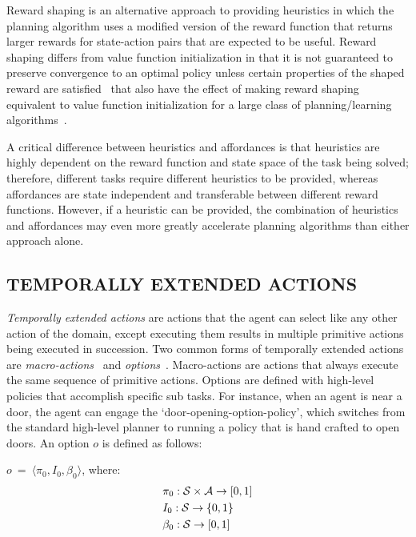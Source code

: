 \documentclass[]{article}
\newcommand{\jmnote}[1]{\textcolor{Green}{\textbf{JM: #1}}}
\begin{document}
Reward shaping is an alternative approach to providing heuristics in which the planning algorithm uses a modified version of the reward function that returns larger rewards for state-action pairs that are expected to be useful. Reward shaping differs from value function initialization in that it is not guaranteed to preserve convergence to an optimal policy unless certain properties of the shaped reward are satisfied~\cite{potshap} that also have the effect of making reward shaping equivalent to value function initialization for a large class of planning/learning algorithms~\cite{Wiewiora:2003fk}.

A critical difference between heuristics and affordances is that heuristics are highly dependent on the reward function and state space of the task being solved; therefore, different tasks require different heuristics to be provided, whereas affordances are state independent and transferable between different reward functions. However, if a heuristic can be provided, the combination of heuristics and affordances may even more greatly accelerate planning algorithms than either approach alone.


\subsection{TEMPORALLY EXTENDED ACTIONS}

{\em Temporally extended actions} are actions that the agent can
select like any other action of the domain, except executing them
results in multiple primitive actions being executed in
succession. Two common forms of temporally extended actions are {\em
  macro-actions}%
  ~and {\em
  options}~\citep{sutton99}. Macro-actions are actions that always
execute the same sequence of primitive actions. Options are defined
with high-level policies that accomplish specific sub tasks. For
instance, when an agent is near a door, the agent can engage the
`door-opening-option-policy', which switches from the standard
high-level planner to running a policy that is hand crafted to open
doors. An option $o$ is defined as follows:

$o\ =\ \langle \pi_0, I_0, \beta_0\rangle$, where:
\begin{align*}
&\pi_0 : {\cal S} \times {\cal A} \rightarrow [0,1] \\
&I_0 : {\cal S} \rightarrow \{0,1\} \\
&\beta_0 : {\cal S} \rightarrow [0,1]
\end{align*}
\end{document}

